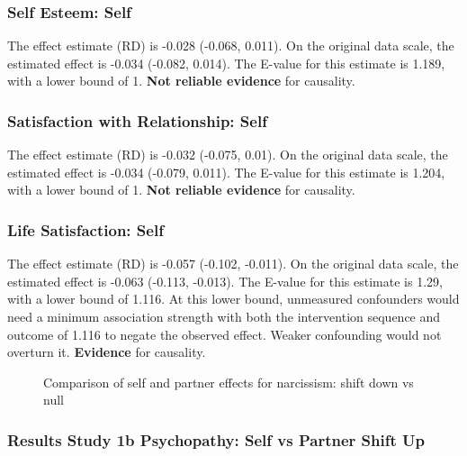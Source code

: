 \documentclass[
  singlecolumn]{article}
\begin{document}
\subsubsection{Self Esteem: Self}\label{self-esteem-self-7}

The effect estimate (RD) is -0.028 (-0.068, 0.011). On the original data
scale, the estimated effect is -0.034 (-0.082, 0.014). The E-value for
this estimate is 1.189, with a lower bound of 1. \textbf{Not reliable
evidence} for causality.

\subsubsection{Satisfaction with Relationship:
Self}\label{satisfaction-with-relationship-self-7}

The effect estimate (RD) is -0.032 (-0.075, 0.01). On the original data
scale, the estimated effect is -0.034 (-0.079, 0.011). The E-value for
this estimate is 1.204, with a lower bound of 1. \textbf{Not reliable
evidence} for causality.

\subsubsection{Life Satisfaction: Self}\label{life-satisfaction-self-7}

The effect estimate (RD) is -0.057 (-0.102, -0.011). On the original
data scale, the estimated effect is -0.063 (-0.113, -0.013). The E-value
for this estimate is 1.29, with a lower bound of 1.116. At this lower
bound, unmeasured confounders would need a minimum association strength
with both the intervention sequence and outcome of 1.116 to negate the
observed effect. Weaker confounding would not overturn it.
\textbf{Evidence} for causality.

\begin{figure}


\caption{\label{fig-results-narcissism-self-partner-down-comparison}Comparison
of self and partner effects for narcissism: shift down vs null}

\end{figure}%

\newpage{}

\subsubsection{Results Study 1b Psychopathy: Self vs Partner Shift
Up}\label{results-study-1b-psychopathy-self-vs-partner-shift-up}
\end{document}
